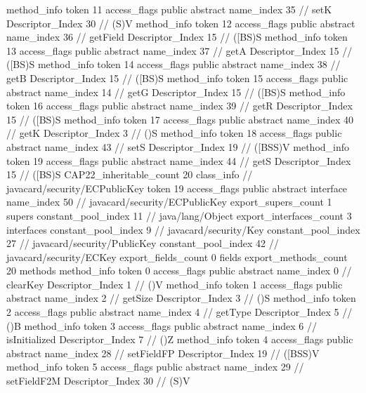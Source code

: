 {{{{{				}
				method_info {
					token	11
					access_flags	public abstract
					name_index	35		// setK
					Descriptor_Index	30		// (S)V
				}
				method_info {
					token	12
					access_flags	public abstract
					name_index	36		// getField
					Descriptor_Index	15		// ([BS)S
				}
				method_info {
					token	13
					access_flags	public abstract
					name_index	37		// getA
					Descriptor_Index	15		// ([BS)S
				}
				method_info {
					token	14
					access_flags	public abstract
					name_index	38		// getB
					Descriptor_Index	15		// ([BS)S
				}
				method_info {
					token	15
					access_flags	public abstract
					name_index	14		// getG
					Descriptor_Index	15		// ([BS)S
				}
				method_info {
					token	16
					access_flags	public abstract
					name_index	39		// getR
					Descriptor_Index	15		// ([BS)S
				}
				method_info {
					token	17
					access_flags	public abstract
					name_index	40		// getK
					Descriptor_Index	3		// ()S
				}
				method_info {
					token	18
					access_flags	public abstract
					name_index	43		// setS
					Descriptor_Index	19		// ([BSS)V
				}
				method_info {
					token	19
					access_flags	public abstract
					name_index	44		// getS
					Descriptor_Index	15		// ([BS)S
				}
			}
			CAP22_inheritable_count	20
		}
		class_info {		// javacard/security/ECPublicKey
			token	19
			access_flags	public abstract interface
			name_index	50		// javacard/security/ECPublicKey
			export_supers_count	1
			supers {
				constant_pool_index	11		// java/lang/Object
			}
			export_interfaces_count	3
			interfaces {
				constant_pool_index	9		// javacard/security/Key
				constant_pool_index	27		// javacard/security/PublicKey
				constant_pool_index	42		// javacard/security/ECKey
			}
			export_fields_count	0
			fields {
			}
			export_methods_count	20
			methods {
				method_info {
					token	0
					access_flags	public abstract
					name_index	0		// clearKey
					Descriptor_Index	1		// ()V
				}
				method_info {
					token	1
					access_flags	public abstract
					name_index	2		// getSize
					Descriptor_Index	3		// ()S
				}
				method_info {
					token	2
					access_flags	public abstract
					name_index	4		// getType
					Descriptor_Index	5		// ()B
				}
				method_info {
					token	3
					access_flags	public abstract
					name_index	6		// isInitialized
					Descriptor_Index	7		// ()Z
				}
				method_info {
					token	4
					access_flags	public abstract
					name_index	28		// setFieldFP
					Descriptor_Index	19		// ([BSS)V
				}
				method_info {
					token	5
					access_flags	public abstract
					name_index	29		// setFieldF2M
					Descriptor_Index	30		// (S)V
}}}}}
